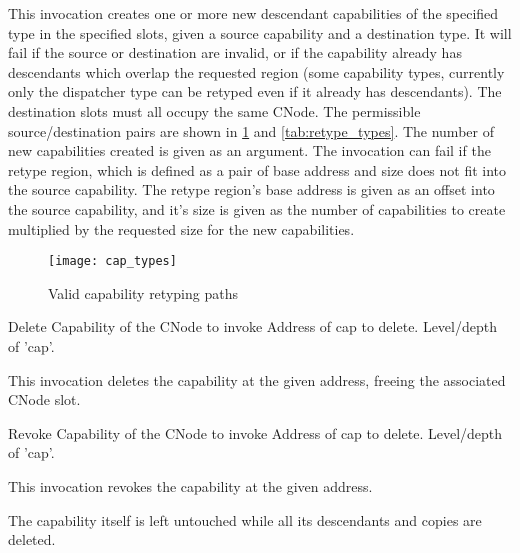 This invocation creates one or more new descendant capabilities of the
specified type in the specified slots, given a source capability and a
destination type.
It will fail if the source or destination are invalid, or if the capability
already has descendants which overlap the requested region (some capability
types, currently only the dispatcher type can be retyped even if it already
has descendants).
The destination slots must all occupy the same CNode.  The permissible
source/destination pairs are shown in \ref{fig:cap_types} and
\ref{tab:retype_types}.
The number of new capabilities created is given as an argument.
The invocation can fail if the retype region, which is defined as a pair of
base address and size does not fit into the source capability.
The retype region's base address is given as an offset into the source
capability, and it's size is given as the number of capabilities to create
multiplied by the requested size for the new capabilities.



\begin{figure}
  \centering
  \texttt{[image: cap\_types]}
  \caption{Valid capability retyping paths}\label{fig:cap_types}
\end{figure}
  
\begin{invocation}{Delete}
 \arg Capability of the CNode to invoke
 \arg Address of cap to delete.
 \arg Level/depth of 'cap'.
\end{invocation}
This invocation deletes the capability at the given address, freeing
the associated CNode slot.

\begin{invocation}{Revoke}
 \arg Capability of the CNode to invoke
 \arg Address of cap to delete.
 \arg Level/depth of 'cap'.
\end{invocation}
This invocation revokes the capability at the given address.

The capability itself is left untouched while all its descendants and
copies are deleted.


